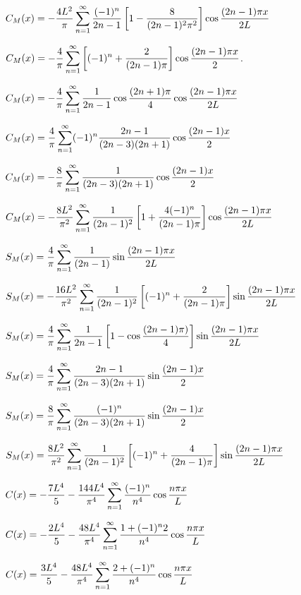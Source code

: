 $C_M(x)=\displaystyle-\frac{4L^2}{\pi}\sum_{n=1}^\infty\frac{(-1)^n}{2n-1}\left[
1-\frac{8}{(2n-1)^2\pi^2}\right]\cos\frac{(2n-1)\pi x}{2L}$

$C_M(x)=
-\displaystyle\frac{4}{\pi}\sum_{n=1}^\infty\left[(-1)^n+\frac{2}{(2n-1)\pi}\right]
\cos\frac{(2n-1)\pi x}{2}$.

$C_M(x)=\displaystyle-\frac{4}{\pi}\sum_{n=1}^\infty\frac{1}{2n-1}\cos\frac{(2n+1)\pi}{4}
\cos\frac{(2n-1)\pi x}{2L}$

 $C_M(x)=
\displaystyle\frac{4}{\pi}\sum_{n=1}^\infty(-1)^n\frac{2n-1}{(2n-3)(2n+1)}
\cos\frac{(2n-1) x}{2}$

$C_M(x)=
-\displaystyle\frac{8}{\pi}\sum_{n=1}^\infty\frac{1}{(2n-3)(2n+1)}
\cos\frac{(2n-1) x}{2}$


$C_M(x)=-\displaystyle\frac{8L^2}{\pi^2}\sum_{n=1}^\infty\frac{1}{(2n-1)^2}\left[
1+\frac{4(-1)^n}{(2n-1)\pi}\right]\cos\frac{(2n-1)\pi
x}{2L}$


$S_M(x)=\displaystyle\frac{4}{\pi}\sum_{n=1}^\infty\frac{1}{(2n-1)}
\sin\frac{(2n-1)\pi x}{2L}$

$S_M(x)=\displaystyle-\frac{16L^2}{\pi^2}\sum_{n=1}^\infty\frac{1}{(2n-1)^2}\left[
(-1)^n+\frac{2}{(2n-1)\pi}\right]\sin\frac{(2n-1)\pi x}{2L}$

$S_M(x)=\displaystyle\frac{4}{\pi}\sum_{n=1}^\infty\frac{1}{2n-1}
\left[1-\cos\frac{(2n-1)\pi)}{4}\right]
\sin\frac{(2n-1)\pi x}{ 2L}$

$S_M(x)=\displaystyle\frac{4}{\pi}\sum_{n=1}^\infty\frac{2n-1}{(2n-3)(2n+1)}\sin\frac{(2n-1)
x}{2}$


$S_M(x)=\displaystyle\frac{8}{\pi}\sum_{n=1}^\infty\frac{(-1)^n}{(2n-3)(2n+1)}\sin\frac{(2n-1)
x}{2}$





$S_M(x)=\displaystyle\frac{8L^2}{\pi^2}\sum_{n=1}^\infty\frac{1}{(2n-1)^2}\left[
(-1)^n+\frac{4}{(2n-1)\pi}\right]\sin\frac{(2n-1)\pi
x}{2L}$

$C(x)=\displaystyle-\frac{7L^4}{5}-\frac{144L^4}{\pi^4}\sum_{n=1}^\infty\frac{(-1)^n}{
n^4}\cos\frac{n\pi x}{L}$

$C(x)=\displaystyle-\frac{2L^4}{5}-\frac{48L^4}{\pi^4}\sum_{n=1}^\infty\frac{1+(-1)^n2}{
n^4}\cos\frac{n\pi x}{L}$

$C(x)=\displaystyle\frac{3L^4}{5}-\frac{48L^4}{\pi^4}\sum_{n=1}^\infty\frac{2+(-1)^n}{
n^4}\cos\frac{n\pi x}{L}$

